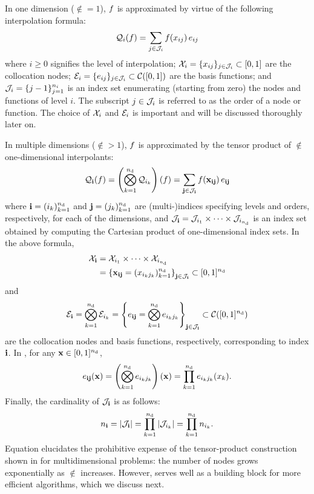 In one dimension ($\nin = 1$), $f$ is approximated by virtue of the following
interpolation formula:
\begin{equation} \elab{tensor-1d}
  \tensor{i}(\f) = \sum_{j \in \oindex_i} \f(\x_{ij}) \, \e_{ij}
\end{equation}
where $i \geq 0$ signifies the level of interpolation; $\mathcal{X}_i = \{ x_{ij} \}_{j
\in \mathcal{J}_i} \subset [0, 1]$ are the collocation nodes; $\mathcal{E}_i = \{ e_{ij}
\}_{j \in \mathcal{J}_i} \subset \mathcal{C}([0, 1])$ are the basis functions; and
$\mathcal{J}_i = \{ j - 1 \}_{j = 1}^{n_i}$ is an index set enumerating (starting
from zero) the nodes and functions of level $i$. The subscript $j \in \mathcal{J}_i$
is referred to as the order of a node or function. The choice of $\mathcal{X}_i$ and
$\mathcal{E}_i$ is important and will be discussed thoroughly later on.

In multiple dimensions ($\nin > 1$), $f$ is approximated by the tensor product
of $\nin$ one-dimensional interpolants:
\begin{equation} \elab{tensor-nd}
  \tensor{\vi}(\f) = \left( \bigotimes_{k = 1}^\nin \tensor{i_k} \right)(\f) = \sum_{\vj \in \oindex_\vi} \f(\vx_{\vi\vj}) \, \e_{\vi\vj}
\end{equation}
where $\mathbf{i} = (i_k)_{k = 1}^{n_\text{d}}$ and $\mathbf{j} = (j_k)_{k = 1}^{n_\text{d}}$ are
(multi-)indices specifying levels and orders, respectively, for each of the
dimensions, and $\mathcal{J}_{\mathbf{i}} = \mathcal{J}_{i_1} \times \cdots \times
\mathcal{J}_{i_{n_\text{d}}}$ is an index set obtained by computing the Cartesian product of
one-dimensional index sets. In the above formula,
\begin{align}
  \X_\vi &= \X_{i_1} \times \cdots \times \X_{i_\nin} \elab{collocation-nodes} \\
         &= \left\{ \vx_{\vi\vj} = (\x_{i_k j_k})_{k = 1}^\nin \right\}_{\vj \in \oindex_\vi} \subset [0, 1]^\nin \nonumber
\end{align}
and
\begin{equation} \elab{basis-functions}
  \E_\vi = \bigotimes_{k = 1}^\nin \E_{i_k}
         = \left\{ \e_{\vi\vj} = \bigotimes_{k = 1}^\nin \e_{i_k j_k} \right\}_{\vj \in \oindex_\vi} \subset \continuous([0, 1]^\nin)
\end{equation}
are the collocation nodes and basis functions, respectively, corresponding to
index $\mathbf{i}$. In , for any $\mathbf{x} \in [0, 1]^{n_\text{d}}$,
\begin{equation} \elab{basis-function}
  \e_{\vi\vj}(\vx) = \left( \bigotimes_{k = 1}^\nin \e_{i_k j_k} \right)(\vx) = \prod_{k = 1}^\nin \e_{i_k j_k}(\x_k).
\end{equation}
Finally, the cardinality of $\mathcal{J}_{\mathbf{i}}$ is as follows:
\begin{equation} \elab{tensor-cardinality}
  \n_\vi = \card{\oindex_\vi} = \prod_{k = 1}^\nin \card{\oindex_{i_k}} = \prod_{k = 1}^\nin \n_{i_k}.
\end{equation}
Equation  elucidates the prohibitive expense of the
tensor-product construction shown in  for multidimensional
problems: the number of nodes grows exponentially as $\nin$ increases. However,
 serves well as a building block for more efficient algorithms,
which we discuss next.
